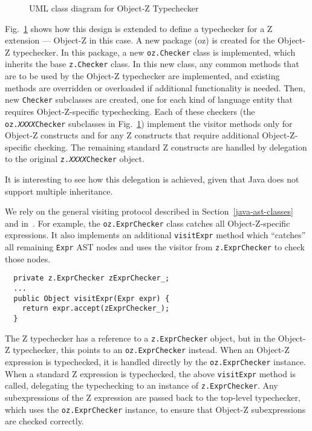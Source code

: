 \documentclass{llncs}
\begin{document}
\def\epsfsize#1#2{0.50#1}
\begin{figure}[t]
\begin{center}
\caption{UML class diagram for Object-Z Typechecker}\label{fig:oztypechecker}
\end{center}
\end{figure}
\def\epsfsize#1#2{\epsfxsize}

Fig.~\ref{fig:oztypechecker} shows how this design is extended to
define a typechecker for a Z extension --- Object-Z in this case.  A
new package (oz) is created for the Object-Z typechecker.  In this
package, a new {\tt oz.Checker} class is implemented, which inherits
the base {\tt z.Checker} class.  In this new class, any common methods
that are to be used by the Object-Z typechecker are implemented, and
existing methods are overridden or overloaded if additional
functionality is needed.  Then, new \texttt{Checker} subclasses are created,
one for each kind of language entity that requires Object-Z-specific
typechecking.  Each of these checkers (the
\texttt{oz.\emph{XXXX}Checker} subclasses in
Fig.~\ref{fig:oztypechecker}) implement the visitor methods only for
Object-Z constructs and for any Z constructs that require additional
Object-Z-specific checking.  The remaining standard Z constructs are
handled by delegation to the original
\texttt{z.\emph{XXXX}Checker} object.

It is interesting to see how this delegation is achieved, given that
Java does not support multiple inheritance.

We rely on the general
visiting protocol described in Section~\ref{java-ast-classes} and
in~\cite{czt}.  For example, the \texttt{oz.ExprChecker} class catches
all Object-Z-specific expressions.  It also implements an additional
\texttt{visitExpr} method which ``catches'' all remaining \texttt{Expr} AST
nodes and uses the visitor from \texttt{z.ExprChecker} to check those
nodes.
\begin{verbatim}
  private z.ExprChecker zExprChecker_;
  ...
  public Object visitExpr(Expr expr) {
    return expr.accept(zExprChecker_);
  }
\end{verbatim}

The Z typechecker has a reference to a \texttt{z.ExprChecker} object,
but in the Object-Z typechecker, this points to an \texttt{oz.ExprChecker}
instead.  When an Object-Z expression is typechecked, it is handled
directly by the \texttt{oz.ExprChecker} instance.  When a standard Z
expression is typechecked, the above \texttt{visitExpr} method
is called, delegating the typechecking to an instance of
\texttt{z.ExprChecker}.  Any subexpressions of the Z expression are
passed back to the top-level type\-chec\-ker, which uses the
\texttt{oz.Expr\-Chec\-ker} instance, to ensure that Ob\-ject-Z subexpressions
are checked correctly.
\end{document}
